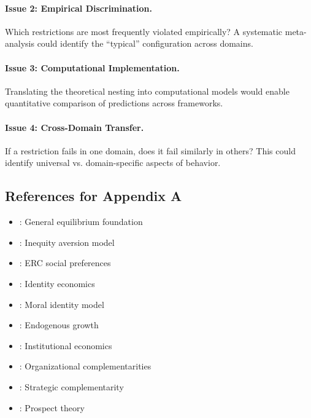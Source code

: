 \paragraph{Issue 2: Empirical Discrimination.}
Which restrictions are most frequently violated empirically? A systematic
meta-analysis could identify the ``typical'' configuration across domains.

\paragraph{Issue 3: Computational Implementation.}
Translating the theoretical nesting into computational models would enable
quantitative comparison of predictions across frameworks.

\paragraph{Issue 4: Cross-Domain Transfer.}
If a restriction fails in one domain, does it fail similarly in others?
This could identify universal vs. domain-specific aspects of behavior.


\subsection{References for Appendix A}
\label{sec:A-references}

\begin{itemize}[nosep]
    \item \citet{arrowdeb}: General equilibrium foundation
    \item \citet{fehrschmidt}: Inequity aversion model
    \item \citet{boltonockenfels}: ERC social preferences
    \item \citet{akerlofkranton}: Identity economics
    \item \citet{benaboutirole}: Moral identity model
    \item \citet{aghionhowitt}: Endogenous growth
    \item \citet{acemoglu}: Institutional economics
    \item \citet{roberts2004}: Organizational complementarities
    \item \citet{milgromroberts1990}: Strategic complementarity
    \item \citet{kahnemantversky1979}: Prospect theory
\end{itemize}

